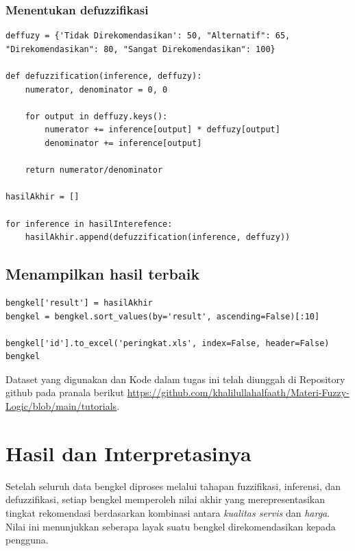 \documentclass[12pt,a4paper]{article}
\theoremstyle{remark}
\begin{document}
\subsubsection*{Menentukan defuzzifikasi}
\begin{verbatim}
deffuzy = {'Tidak Direkomendasikan': 50, "Alternatif": 65, "Direkomendasikan": 80, "Sangat Direkomendasikan": 100}

def defuzzification(inference, deffuzy):
    numerator, denominator = 0, 0
    
    for output in deffuzy.keys():
        numerator += inference[output] * deffuzy[output]
        denominator += inference[output]
        
    return numerator/denominator

hasilAkhir = []

for inference in hasilInterefence:
    hasilAkhir.append(defuzzification(inference, deffuzy))
\end{verbatim}
\subsection*{Menampilkan hasil terbaik}
\begin{verbatim}
bengkel['result'] = hasilAkhir
bengkel = bengkel.sort_values(by='result', ascending=False)[:10]

bengkel['id'].to_excel('peringkat.xls', index=False, header=False)  
bengkel
\end{verbatim}

Dataset yang digunakan dan Kode dalam tugas ini telah diunggah di Repository github pada pranala berikut \url{https://github.com/khalilullahalfaath/Materi-Fuzzy-Logic/blob/main/tutorials}.

\section{Hasil dan Interpretasinya}


Setelah seluruh data bengkel diproses melalui tahapan fuzzifikasi, inferensi, dan defuzzifikasi, setiap bengkel memperoleh nilai akhir yang merepresentasikan tingkat rekomendasi berdasarkan kombinasi antara \textit{kualitas servis} dan \textit{harga}. Nilai ini menunjukkan seberapa layak suatu bengkel direkomendasikan kepada pengguna.
\end{document}
